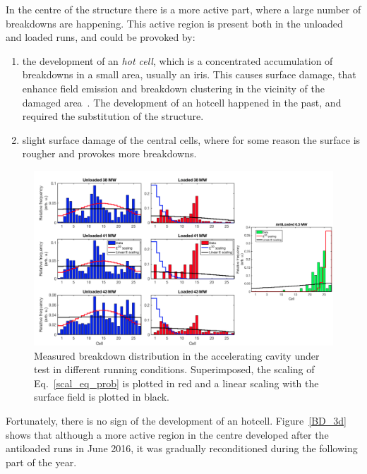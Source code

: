 In the centre of the structure there is a more active part, where a large number of breakdowns are happening. This active region is present both in the unloaded and loaded runs, and could be provoked by: 
\begin{enumerate}
\item the development of an \textit{hot cell}, which is a concentrated accumulation of breakdowns in a small area, usually an iris. This causes surface damage, that enhance field emission and breakdown clustering in the vicinity of the damaged area~\cite{Wang:2008ap}. The development of an hotcell happened in the past, and required the substitution of the structure.
\item slight surface damage of the central cells, where for some reason the surface is rougher and provokes more breakdowns. 
\end{enumerate}

\begin{landscape}

\begin{figure}[p]
\centering 
\includegraphics[scale=0.53]{pictures/distro_all.png}
\caption{Measured breakdown distribution in the accelerating cavity under test in different running conditions. Superimposed, the scaling of Eq.~\ref{scal_eq_prob} is plotted in red and a linear scaling with the surface field is plotted in black.}
\label{BD_distro}
\end{figure}
 
\end{landscape}



Fortunately, there is no sign of the development of an hotcell. Figure~\ref{BD_3d} shows that although a more active region in the centre developed after the antiloaded runs in June 2016, it was gradually reconditioned during the following part of the year. 

